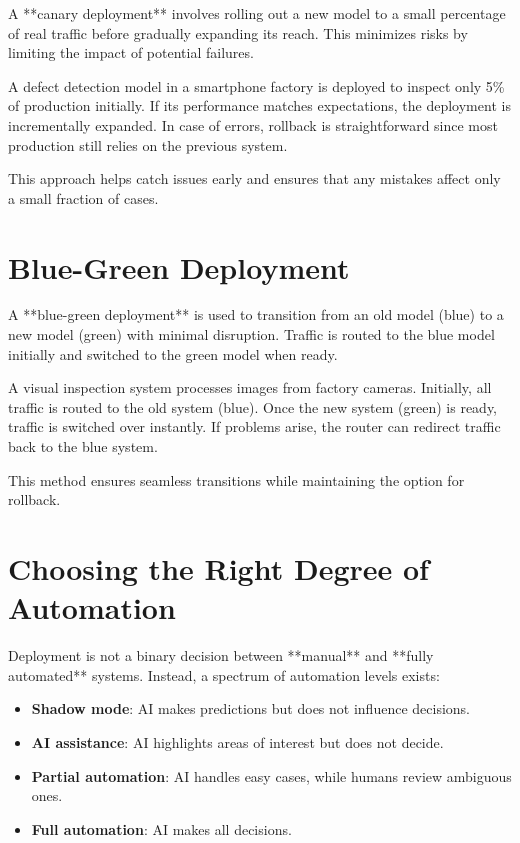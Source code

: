 \documentclass[12pt,openany]{book}
\begin{document}
A **canary deployment** involves rolling out a new model to a small percentage of real traffic before gradually expanding its reach. This minimizes risks by limiting the impact of potential failures.

\begin{examplebox}
   A defect detection model in a smartphone factory is deployed to inspect only 5\% of production initially. If its performance matches expectations, the deployment is incrementally expanded. In case of errors, rollback is straightforward since most production still relies on the previous system.
\end{examplebox}

This approach helps catch issues early and ensures that any mistakes affect only a small fraction of cases.

\section{Blue-Green Deployment}

A **blue-green deployment** is used to transition from an old model (blue) to a new model (green) with minimal disruption. Traffic is routed to the blue model initially and switched to the green model when ready.

\begin{examplebox}
   A visual inspection system processes images from factory cameras. Initially, all traffic is routed to the old system (blue). Once the new system (green) is ready, traffic is switched over instantly. If problems arise, the router can redirect traffic back to the blue system.
\end{examplebox}

This method ensures seamless transitions while maintaining the option for rollback.

\section{Choosing the Right Degree of Automation}

Deployment is not a binary decision between **manual** and **fully automated** systems. Instead, a spectrum of automation levels exists:

\begin{itemize}
    \item \textbf{Shadow mode}: AI makes predictions but does not influence decisions.
    \item \textbf{AI assistance}: AI highlights areas of interest but does not decide.
    \item \textbf{Partial automation}: AI handles easy cases, while humans review ambiguous ones.
    \item \textbf{Full automation}: AI makes all decisions.
\end{itemize}
\end{document}
